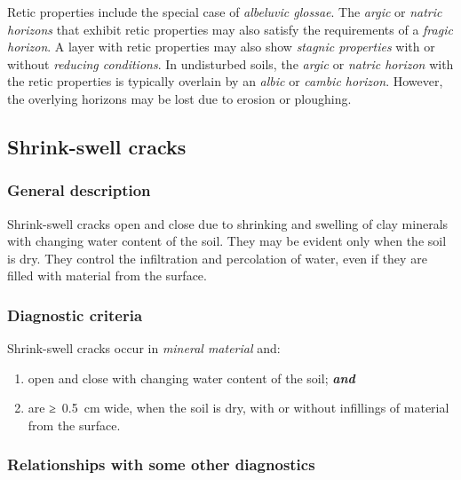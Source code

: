 \documentclass[
  letterpaper,
  DIV=11,
  numbers=noendperiod]{scrreprt}
\providecommand{\tightlist}{%
  \setlength{\itemsep}{0pt}\setlength{\parskip}{0pt}}\usepackage{longtable,booktabs,array}
\begin{document}
Retic properties include the special case of \emph{albeluvic glossae}.
The \emph{argic} or \emph{natric horizons} that exhibit retic properties
may also satisfy the requirements of a \emph{fragic horizon}. A layer
with retic properties may also show \emph{stagnic properties} with or
without \emph{reducing conditions}. In undisturbed soils, the
\emph{argic} or \emph{natric horizon} with the retic properties is
typically overlain by an \emph{albic} or \emph{cambic horizon}. However,
the overlying horizons may be lost due to erosion or ploughing.

\hypertarget{shrink-swell-cracks}{%
\subsection{Shrink-swell cracks}\label{shrink-swell-cracks}}

\hypertarget{general-description-49}{%
\subsubsection{General description}\label{general-description-49}}

Shrink-swell cracks open and close due to shrinking and swelling of clay
minerals with changing water content of the soil. They may be evident
only when the soil is dry. They control the infiltration and percolation
of water, even if they are filled with material from the surface.

\hypertarget{diagnostic-criteria-51}{%
\subsubsection{Diagnostic criteria}\label{diagnostic-criteria-51}}

Shrink-swell cracks occur in \emph{mineral material} and:

\begin{enumerate}
\def\labelenumi{\arabic{enumi}.}
\tightlist
\item
  open and close with changing water content of the soil;
  \textbf{\emph{and}}
\item
  are ≥~0.5~cm wide, when the soil is dry, with or without infillings of
  material from the surface.
\end{enumerate}

\hypertarget{relationships-with-some-other-diagnostics-46}{%
\subsubsection{Relationships with some other
diagnostics}\label{relationships-with-some-other-diagnostics-46}}
\end{document}
